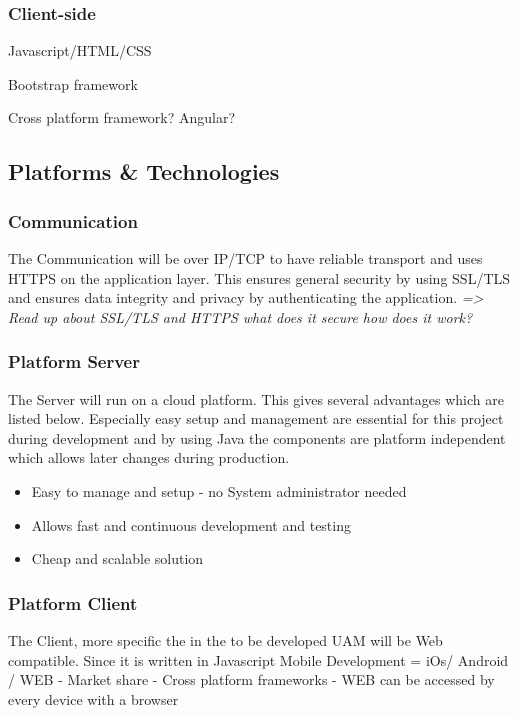 \documentclass[a4paper,11pt]{article}
\begin{document}
\subsubsection{Client-side}

Javascript/HTML/CSS

Bootstrap framework

Cross platform framework?
Angular?


\subsection{Platforms \& Technologies}

\subsubsection{Communication}
The Communication will be over IP/TCP to have reliable transport and uses HTTPS on the application layer. This ensures general security by using SSL/TLS and ensures data integrity and privacy by authenticating the application.
\textit{=> Read up about SSL/TLS and HTTPS what does it secure how does it work?}

\subsubsection{Platform Server}
The Server will run on a cloud platform. This gives several advantages which are listed below. Especially easy setup and management are essential for this project during development and by using Java the components are platform independent which allows later changes during production.
\begin{itemize}
\item Easy to manage and setup - no System administrator needed
\item Allows fast and continuous development and testing
\item Cheap and scalable solution
\end{itemize}

\subsubsection{Platform Client}
The Client, more specific the in the to be developed UAM will be Web compatible. Since it is written in Javascript
Mobile Development = iOs/ Android / WEB
	- Market share
	- Cross platform frameworks 
	- WEB can be accessed by every device with a browser
	
\end{document}
